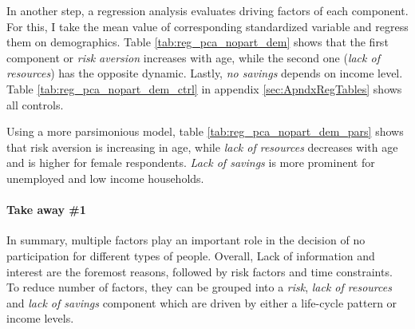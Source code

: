 \documentclass[ProjectABM]{subfiles}
\begin{document}


In another step, a regression analysis evaluates driving factors of each component. For this, I take the mean value of corresponding standardized variable and regress them on demographics. Table \ref{tab:reg_pca_nopart_dem} shows that the first component or \textit{risk aversion} increases with age, while the second one (\textit{lack of resources}) has the opposite dynamic. Lastly, \textit{no savings} depends on income level. Table \ref{tab:reg_pca_nopart_dem_ctrl} in appendix \ref{sec:ApndxRegTables} shows all controls.



Using a more parsimonious model, table \ref{tab:reg_pca_nopart_dem_pars} shows that risk aversion is increasing in age, while \textit{lack of resources} decreases with age and is higher for female respondents. \textit{Lack of savings} is more prominent for unemployed and low income households.%




\paragraph{Take away \#1}
In summary, multiple factors play an important role in the decision of no participation for different types of people. Overall, Lack of information and interest are the foremost reasons, followed by risk factors and time constraints. To reduce number of factors, they can be grouped into a \textit{risk}, \textit{lack of resources} and \textit{lack of savings} component which are driven by either a life-cycle pattern or income levels. %
\end{document}

